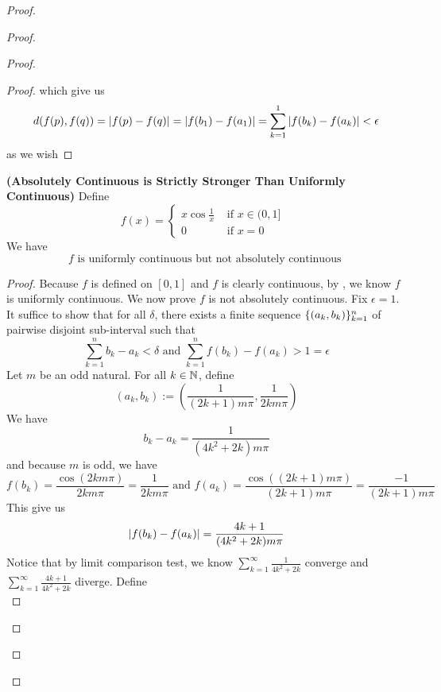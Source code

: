 \documentclass{report}
\begin{document}
\begin{proof}
\begin{proof}
\begin{proof}
\begin{proof}
which give us 
\begin{equation*}
d(f(p),f(q))=|f(p)-f(q)|=|f(b_1)-f(a_1)|=\sum_{k=1}^1 |f(b_k)-f(a_k)|<\epsilon 
\end{equation*}
as we wish
\end{proof}
\begin{theorem}
\label{5.5.3}
\textbf{(Absolutely Continuous is Strictly Stronger Than Uniformly Continuous)} Define
\begin{equation*}
f(x)=\begin{cases}
  x \cos \frac{1}{x}& \text{ if $x \in (0,1]$ }\\
  0& \text{ if $x=0$ }
\end{cases}
\end{equation*}
We have 
\begin{equation*}
f\text{ is uniformly continuous but not absolutely continuous }
\end{equation*}
\end{theorem}
\begin{proof}
Because $f$ is defined on $[0,1]$ and $f$ is clearly continuous, by  , we know $f$ is uniformly continuous. We now prove $f$ is not absolutely continuous. Fix $\epsilon =1$. It suffice to show that for all $\delta$, there exists a finite sequence $\{ (a_k,b_k) \}_{k=1}^n$ of pairwise disjoint sub-interval such that 
\begin{equation*}
\sum_{k=1}^n b_k-a_k<\delta\text{ and }\sum_{k=1}^n f(b_k)-f(a_k)>1=\epsilon 
\end{equation*}
Let $m$ be an odd natural. For all $k\in\mathbb{N}$, define 
\begin{equation*}
  (a_k,b_k):=(\frac{1}{(2k+1)m\pi},\frac{1}{2km\pi})
\end{equation*}
We have 
\begin{equation*}
b_k-a_k=\frac{1}{ (4k^2+2k)m \pi}
\end{equation*}
and because $m$ is odd, we have 
\begin{equation*}
f(b_k)=\frac{\cos (2km\pi)}{2km \pi}=\frac{1}{2km\pi}\text{ and }f(a_k)=\frac{\cos ((2k+1 )m\pi)}{(2k+1)m\pi }=\frac{-1}{(2k+1)m \pi}
\end{equation*}
This give us 
\begin{equation*}
|f(b_k)-f(a_k)|=\frac{4k+1}{(4k^2+2k)m \pi }
\end{equation*}
Notice that by limit comparison test, we know $\sum _{k=1}^\infty \frac{1}{4k^2+2k}$ converge and $\sum_{k=1}^\infty \frac{4k+1}{4k^2+2k}$ diverge. Define
\begin{equation*}

\end{equation*}
\end{proof}
\end{proof}
\end{proof}
\end{proof}
\end{document}

